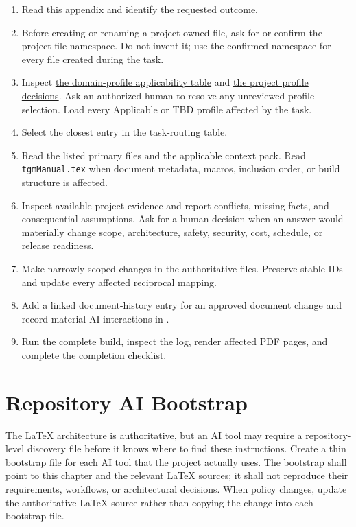 \begin{enumerate}
\item Read this appendix and identify the requested outcome.
\item Before creating or renaming a project-owned file, ask for or confirm the
project file namespace. Do not invent it; use the confirmed namespace for every
file created during the task.
\item Inspect \hyperref[Table:DomainProfileApplicability]{the domain-profile
applicability table} and \hyperref[Table:ProjectDomainProfiles]{the project
profile decisions}. Ask an authorized human to resolve any unreviewed profile
selection. Load every Applicable or TBD profile affected by the task.
\item Select the closest entry in
\hyperref[Table:AITaskRouting]{the task-routing table}.
\item Read the listed primary files and the applicable context pack. Read
\texttt{tgmManual.tex} when document metadata, macros, inclusion order, or
build structure is affected.
\item Inspect available project evidence and report conflicts, missing facts,
and consequential assumptions. Ask for a human decision when an answer would
materially change scope, architecture, safety, security, cost, schedule, or
release readiness.
\item Make narrowly scoped changes in the authoritative files. Preserve stable
IDs and update every affected reciprocal mapping.
\item Add a linked document-history entry for an approved document change and
record material AI interactions in .
\item Run the complete build, inspect the log, render affected PDF pages, and
complete \hyperref[Table:AICompletionChecklist]{the completion checklist}.
\end{enumerate}

\section{Repository AI Bootstrap}
\label{Section:AIRepositoryBootstrap}

The LaTeX architecture is authoritative, but an AI tool may require a
repository-level discovery file before it knows where to find these
instructions. Create a thin bootstrap file for each AI tool that the project
actually uses. The bootstrap shall point to this chapter and the relevant
LaTeX sources; it shall not reproduce their requirements, workflows, or
architectural decisions. When policy changes, update the authoritative LaTeX
source rather than copying the change into each bootstrap file.

